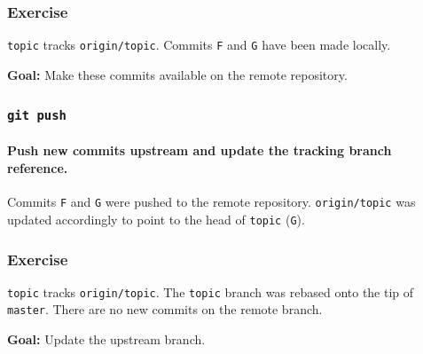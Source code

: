 \documentclass{beamer}
\newcommand\gitcmd[1]{\texttt{git #1}}
\newcommand\grefspec[1]{\texttt{#1}}
\newcommand\gbranch[1]{\texttt{#1}}
\newcommand\gremotebranch[1]{\texttt{#1}}
\newcommand\goal[1]{\textbf{Goal:} #1}
\begin{document}
\begin{frame}
  \frametitle{Exercise}
  \gbranch{topic} tracks \gremotebranch{origin/topic}. Commits \grefspec{F} and \grefspec{G} have been made locally.

  \goal{Make these commits available on the remote repository.}

  \begin{figure}
    \centering
  \end{figure}
\end{frame}

\begin{frame}
  \frametitle{\gitcmd{push}}
  \framesubtitle{Push new commits upstream and update the tracking branch reference.}

  \begin{figure}
    \centering
  \end{figure}

  Commits \grefspec{F} and \grefspec{G} were pushed to the remote repository.
  \gremotebranch{origin/topic} was updated accordingly to point to the head of \gbranch{topic} (\grefspec{G}).
\end{frame}

\begin{frame}
  \frametitle{Exercise}

  \gbranch{topic} tracks \gbranch{origin/topic}. The \gbranch{topic} branch was rebased onto the tip of \gbranch{master}.
  There are no new commits on the remote branch.

  \goal{Update the upstream branch.}

  \begin{figure}
    \centering
  \end{figure}
\end{frame}
\end{document}
